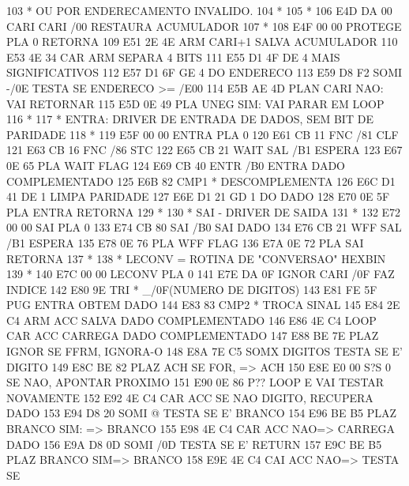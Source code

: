 \documentclass[a4paper,12pt]{article}
\begin{document}
{ 103  *                      OU POR ENDERECAMENTO INVALIDO.
 104  *
 105  *
 106  E4D DA 00  CARI    CARI    /00     RESTAURA ACUMULADOR
 107  *
 108  E4F 00 00  PROTEGE PLA     0       RETORNA
 109  E51 2E 4E          ARM     CARI+1  SALVA ACUMULADOR
 110  E53 4E 34          CAR     ARM     SEPARA 4 BITS
 111  E55 D1 4F          DE      4       MAIS SIGNIFICATIVOS
 112  E57 D1 6F          GE      4       DO ENDERECO
 113  E59 D8 F2          SOMI    -/0E    TESTA SE ENDERECO >= /E00
 114  E5B AE 4D          PLAN    CARI    NAO: VAI RETORNAR
 115  E5D 0E 49          PLA     UNEG    SIM: VAI PARAR EM LOOP
 116  *
 117  * ENTRA: DRIVER DE ENTRADA DE DADOS, SEM BIT DE PARIDADE
 118  *
 119  E5F 00 00  ENTRA   PLA     0
 120  E61 CB 11          FNC     /81     CLF
 121  E63 CB 16          FNC     /86     STC
 122  E65 CB 21  WAIT    SAL     /B1     ESPERA
 123  E67 0E 65          PLA     WAIT    FLAG
 124  E69 CB 40          ENTR    /B0     ENTRA DADO COMPLEMENTADO
 125  E6B 82             CMP1    *       DESCOMPLEMENTA
 126  E6C D1 41          DE      1       LIMPA PARIDADE
 127  E6E D1 21          GD      1       DO DADO
 128  E70 0E 5F          PLA     ENTRA   RETORNA
 129  *
 130  * SAI - DRIVER DE SAIDA
 131  *
 132  E72 00 00  SAI     PLA     0
 133  E74 CB 80          SAI     /B0     SAI DADO
 134  E76 CB 21  WFF     SAL     /B1     ESPERA
 135  E78 0E 76          PLA     WFF     FLAG
 136  E7A 0E 72          PLA     SAI     RETORNA
 137  *
 138  * LECONV = ROTINA DE "CONVERSAO" HEXBIN
 139  *
 140  E7C 00 00  LECONV  PLA     0
 141  E7E DA 0F  IGNOR   CARI    /0F     FAZ INDICE
 142  E80 9E             TRI     *       _/0F(NUMERO DE DIGITOS)
 143  E81 FE 5F          PUG     ENTRA   OBTEM DADO
 144  E83 83             CMP2    *       TROCA SINAL
 145  E84 2E C4          ARM     ACC     SALVA DADO COMPLEMENTADO
 146  E86 4E C4  LOOP    CAR     ACC     CARREGA DADO COMPLEMENTADO
 147  E88 BE 7E          PLAZ    IGNOR   SE FFRM, IGNORA-O
 148  E8A 7E C5          SOMX    DIGITOS TESTA SE E' DIGITO
 149  E8C BE 82          PLAZ    ACH     SE FOR, => ACH
 150  E8E E0 00          S?S     0       SE NAO, APONTAR PROXIMO
 151  E90 0E 86          P??     LOOP    E VAI TESTAR NOVAMENTE
 152  E92 4E C4          CAR     ACC     SE NAO DIGITO, RECUPERA DADO
 153  E94 D8 20          SOMI    @       TESTA SE E' BRANCO
 154  E96 BE B5          PLAZ    BRANCO  SIM: => BRANCO
 155  E98 4E C4          CAR     ACC     NAO=> CARREGA DADO
 156  E9A D8 0D          SOMI    /0D     TESTA SE E' RETURN
 157  E9C BE B5          PLAZ    BRANCO  SIM=> BRANCO
 158  E9E 4E C4          CAI     ACC     NAO=> TESTA SE
}
\end{document}
